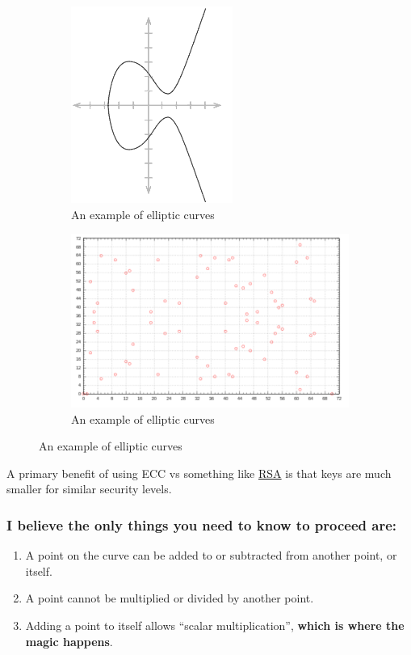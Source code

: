 \begin{figure}[H]
	\begin{subfigure}{0.4\linewidth}
		\centering
		\includegraphics[width=0.6\linewidth]{./images/blog-series/xmr-crypto-luigi1111/elliptic-curve-eg.png}
		\caption{An example of elliptic curves}\label{fig-xmr-crypto-luigi1111-elliptic-curve-eg}
	\end{subfigure}
	\begin{subfigure}{0.55\linewidth}
		\centering
		\includegraphics[width=0.8\linewidth]{./images/blog-series/xmr-crypto-luigi1111/elliptic-curve-GF-eg.png}
		\caption{An example of elliptic curves}\label{fig-xmr-crypto-luigi1111-elliptic-curve-GF-eg}
	\end{subfigure}
\end{figure}
A primary benefit of using ECC vs something like \href{https://en.wikipedia.org/wiki/RSA_(cryptosystem)}{RSA} is that keys are much smaller for similar security levels.

\subsubsection{I believe the only things you need to know to proceed are:}
	\begin{enumerate}
		\item A point on the curve can be added to or subtracted from another point, or itself.
		\item A point cannot be multiplied or divided by another point.
		\item Adding a point to itself allows ``scalar multiplication'', \textbf{which is where the magic happens}.
	\end{enumerate}

